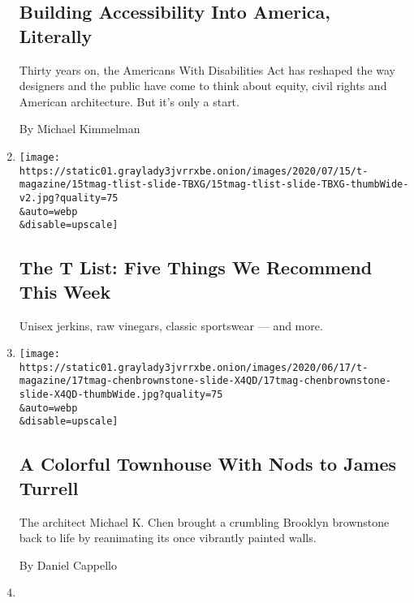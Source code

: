 \begin{enumerate}
  \hypertarget{building-accessibility-into-america-literally}{%
  \subsection{Building Accessibility Into America,
  Literally}\label{building-accessibility-into-america-literally}}

  Thirty years on, the Americans With Disabilities Act has reshaped the
  way designers and the public have come to think about equity, civil
  rights and American architecture. But it's only a start.

  By Michael Kimmelman
\item
  \href{/2020/07/16/t-magazine/margo-price-album-tlist.html}{}

  \texttt{[image: https://static01.graylady3jvrrxbe.onion/images/2020/07/15/t-magazine/15tmag-tlist-slide-TBXG/15tmag-tlist-slide-TBXG-thumbWide-v2.jpg?quality=75\\\&auto=webp\\\&disable=upscale]}

  \hypertarget{the-t-list-five-things-we-recommend-this-week-1}{%
  \subsection{The T List: Five Things We Recommend This
  Week}\label{the-t-list-five-things-we-recommend-this-week-1}}

  Unisex jerkins, raw vinegars, classic sportswear --- and more.
\item
  \href{/2020/07/13/t-magazine/brownstone-brooklyn-design.html}{}

  \texttt{[image: https://static01.graylady3jvrrxbe.onion/images/2020/06/17/t-magazine/17tmag-chenbrownstone-slide-X4QD/17tmag-chenbrownstone-slide-X4QD-thumbWide.jpg?quality=75\\\&auto=webp\\\&disable=upscale]}

  \hypertarget{a-colorful-townhouse-with-nods-to-james-turrell}{%
  \subsection{A Colorful Townhouse With Nods to James
  Turrell}\label{a-colorful-townhouse-with-nods-to-james-turrell}}

  The architect Michael K. Chen brought a crumbling Brooklyn brownstone
  back to life by reanimating its once vibrantly painted walls.

  By Daniel Cappello
\item
  \href{/2020/07/09/t-magazine/robert-longo-quarantine-films.html}{}


\end{enumerate}

